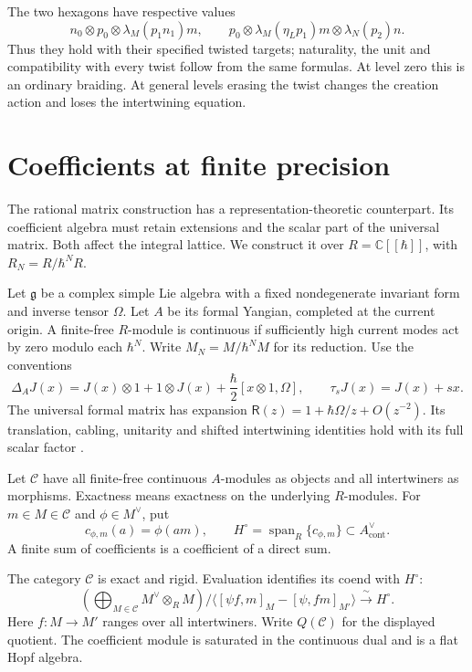 The two hexagons have respective values
\[
 n_0\otimes p_0\otimes\lambda_M(p_1n_1)m,\qquad
 p_0\otimes\lambda_M(\eta_Lp_1)m\otimes\lambda_N(p_2)n.
\]
Thus they hold with their specified twisted targets;
naturality, the unit and compatibility with every twist follow
from the same formulas.
At level zero this is an ordinary braiding.
At general levels erasing the twist changes the creation action
and loses the intertwining equation.

\section{Coefficients at finite precision}
\label{cyrep:sec:formal-coefficients}

The rational matrix construction has a representation-theoretic
counterpart. Its coefficient algebra must retain extensions and the
scalar part of the universal matrix. Both affect the integral lattice.
We construct it over \(R=\mathbb C[[\hbar]]\), with
\(R_N=R/\hbar^NR\).

Let \(\mathfrak g\) be a complex simple Lie algebra with a fixed
nondegenerate invariant form and inverse tensor \(\Omega\).
Let \(A\) be its formal Yangian, completed at the current origin.
A finite-free \(R\)-module is continuous if sufficiently high current
modes act by zero modulo each \(\hbar^N\). Write
\(M_N=M/\hbar^NM\) for its reduction.
Use the conventions
\[
 \Delta_AJ(x)=J(x)\otimes1+1\otimes J(x)
                 +\frac{\hbar}{2}[x\otimes1,\Omega],\qquad
 \tau_sJ(x)=J(x)+sx.
\]
The universal formal matrix has expansion
\(\mathsf R(z)=1+\hbar\Omega/z+O(z^{-2})\).
Its translation, cabling, unitarity and shifted intertwining
identities hold with its full scalar factor
\cite[Theorem 7.4]{GautamToledanoLaredoWendlandt2021}.

Let \(\mathcal C\) have all finite-free continuous \(A\)-modules as
objects and all intertwiners as morphisms. Exactness means exactness
on the underlying \(R\)-modules. For \(m\in M\in\mathcal C\) and
\(\phi\in M^\vee\), put
\[
 c_{\phi,m}(a)=\phi(am),\qquad
 H^\circ=\operatorname{span}_R\{c_{\phi,m}\}
                         \subset A^\vee_{\mathrm{cont}}.
\]
A finite sum of coefficients is a coefficient of a direct sum.

\begin{proposition}\label{cyrep:prop:coefficient-lattice}
The category \(\mathcal C\) is exact and rigid. Evaluation identifies
its coend with \(H^\circ\):
\[
 \left(\bigoplus_{M\in\mathcal C}M^\vee\otimes_RM\right)
 \big/\langle[\psi f,m]_M-[\psi,fm]_{M'}\rangle
       \xrightarrow{\ \sim\ }H^\circ.
\]
Here \(f:M\to M'\) ranges over all intertwiners.
Write \(Q(\mathcal C)\) for the displayed quotient.
The coefficient module is saturated in the continuous dual and is
a flat Hopf algebra.
\end{proposition}

